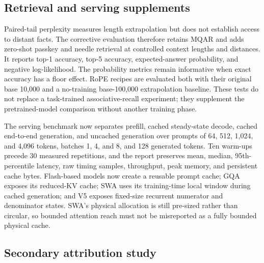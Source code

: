 \documentclass[11pt,a4paper]{article}
\theoremstyle{definition}
\theoremstyle{plain}
\begin{document}
\subsection{Retrieval and serving supplements}

Paired-tail perplexity measures length extrapolation but does not establish access to
distant facts.  The corrective evaluation therefore retains MQAR and adds zero-shot
passkey and needle retrieval at controlled context lengths and distances.  It reports
top-1 accuracy, top-5 accuracy, expected-answer probability, and negative
log-likelihood.  The probability metrics remain informative when exact accuracy has
a floor effect.  RoPE recipes are evaluated both with their original base 10,000 and
a no-training base-100,000 extrapolation baseline.  These tests do not replace a
task-trained associative-recall experiment; they supplement the pretrained-model
comparison without another training phase.

The serving benchmark now separates prefill, cached steady-state decode, cached
end-to-end generation, and uncached generation over prompts of 64, 512, 1,024, and
4,096 tokens, batches 1, 4, and 8, and 128 generated tokens.  Ten warm-ups precede 30
measured repetitions, and the report preserves mean, median, 95th-percentile latency,
raw timing samples, throughput, peak memory, and persistent cache bytes.  Flash-based
models now create a reusable prompt cache; GQA exposes its reduced-KV cache; SWA uses
its training-time local window during cached generation; and V5 exposes fixed-size
recurrent numerator and denominator states.  SWA's physical allocation is still
pre-sized rather than circular, so bounded attention reach must not be misreported as
a fully bounded physical cache.

\subsection{Secondary attribution study}
\end{document}
